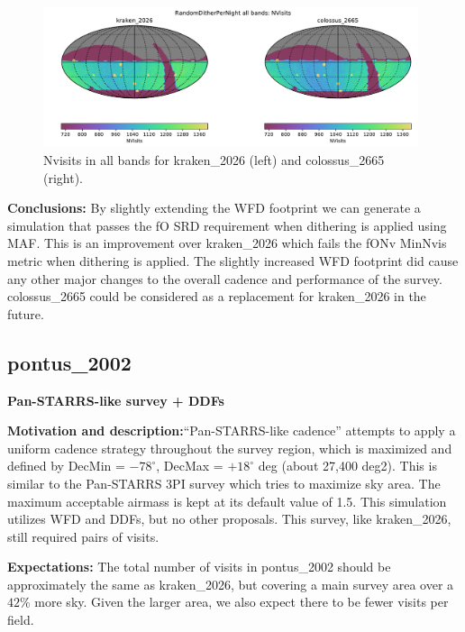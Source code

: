 \documentclass[DM,lsstdraft,authoryear,toc]{lsstdoc}
\begin{document}
\begin{figure}[ht]
\centering
\includegraphics[width=0.98\textwidth]{figures/colossus_2665_kraken_2026_NVisits_RandomDitherPerNight_all_bands_HEAL_ComboSkyMap.pdf}
\caption{Nvisits in all bands for kraken\_2026 (left) and colossus\_2665 (right).}
\label{fig:dither_nvisits-2665}
\end{figure}

\textbf{Conclusions:} By slightly extending the WFD footprint we can generate a simulation that passes the fO SRD
requirement when dithering is applied using MAF. This is an improvement over kraken\_2026 which fails the fONv MinNvis metric 
when dithering is applied. The slightly increased WFD footprint did cause any other major changes to the overall cadence and
performance of the survey. colossus\_2665 could be considered as a replacement for kraken\_2026 in the future.

\subsection{pontus\_2002} \label{pontus2002}

\textbf{Pan-STARRS-like survey + DDFs} 

\textbf{Motivation and description:}``Pan-STARRS-like cadence'' attempts to apply a uniform cadence strategy 
throughout the survey region, which is maximized and defined by DecMin = $-78^{\circ}$, DecMax = $+18^{\circ}$ deg (about 27,400 deg2). 
This is similar to the Pan-STARRS 3PI survey which tries to maximize sky area. The maximum acceptable airmass 
is kept at its default value of 1.5. This simulation utilizes WFD and DDFs, but no other proposals. 
This survey, like kraken\_2026, still required pairs of visits.

\textbf{Expectations:} The total number of visits in pontus\_2002 should be approximately the same as kraken\_2026,
but covering a main survey area over a $42\%$ more sky. Given the larger area, we also expect there to be
fewer visits per field.
\end{document}
